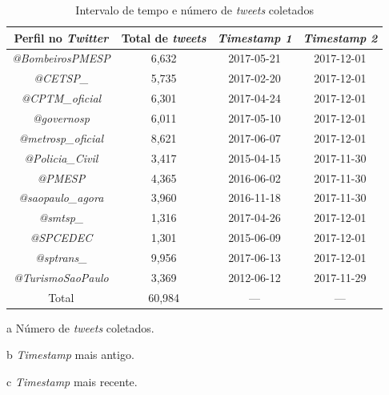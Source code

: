 \documentclass[
	12pt,				%
	oneside,			%
	a4paper,			%
	english,			%
	brazil				%
	]{abntex2ppgsi}
\begin{document}
{{{\begin{table}[!htb]
\centering
\caption{Intervalo de tempo e número de \textit{tweets} coletados}
	\label{tab:tweetsCollected}
\begin{threeparttable}
\begin{tabular}{c|c|c|c}
\toprule
\textbf {Perfil no \textit{Twitter}} &\textbf{Total de \textit{tweets}\tnote{a}}  &\textbf{ \textit{Timestamp 1\tnote{b}}} & \textbf{\textit{Timestamp 2\tnote{c}}} \\ 
\midrule
\textit{@BombeirosPMESP} & 6,632 & 2017-05-21 & 2017-12-01 \\
\hline
\textit{@CETSP\_} & 5,735 & 2017-02-20  & 2017-12-01 \\
\hline
\textit{@CPTM\_oficial} & 6,301 & 2017-04-24 & 2017-12-01 \\
\hline
\textit{@governosp}  & 6,011 & 2017-05-10 & 2017-12-01 \\
\hline
\textit{@metrosp\_oficial} & 8,621 & 2017-06-07 & 2017-12-01 \\
\hline
\textit{@Policia\_Civil}  & 3,417 & 2015-04-15 & 2017-11-30 \\
\hline
\textit{@PMESP}  & 4,365 & 2016-06-02 & 2017-11-30 \\
\hline
\textit{@saopaulo\_agora}  & 3,960 & 2016-11-18 & 2017-11-30 \\
\hline
\textit{@smtsp\_} & 1,316 & 2017-04-26 & 2017-12-01 \\
\hline
\textit{@SPCEDEC} & 1,301 & 2015-06-09 & 2017-12-01 \\
\hline
\textit{@sptrans\_} & 9,956 & 2017-06-13 & 2017-12-01 \\
\hline
\textit{@TurismoSaoPaulo} & 3,369 & 2012-06-12 & 2017-11-29 \\
\midrule
\midrule
Total & 60,984 & --- & --- \\
\bottomrule
\end{tabular}
\begin{tablenotes}
            \item[a] Número de \textit{tweets} coletados.
            \item[b] \textit{Timestamp} mais antigo.
            \item[c] \textit{Timestamp} mais recente.
        \end{tablenotes}
\end{threeparttable}
\end{table}


}}}
\end{document}
